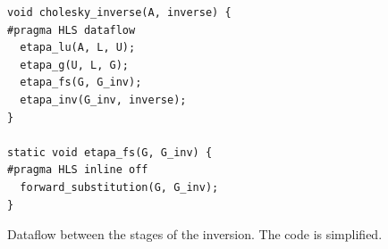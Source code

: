 
\begin{figure}[!ht]
\caption{Dataflow between the stages of the inversion. The code is simplified.}
\label{fig:hw-dataflow}
\vspace{4pt}
\centering
\begin{minipage}[c]{0.45\textwidth}
\fontsize{8}{9.6}\selectfont
\begin{verbatim}
void cholesky_inverse(A, inverse) {
#pragma HLS dataflow
  etapa_lu(A, L, U);
  etapa_g(U, L, G);
  etapa_fs(G, G_inv);
  etapa_inv(G_inv, inverse);
}

static void etapa_fs(G, G_inv) {
#pragma HLS inline off
  forward_substitution(G, G_inv);
}
\end{verbatim}
\end{minipage}


\end{figure}
